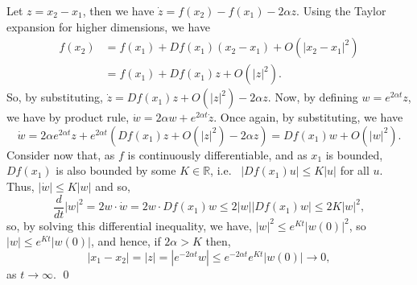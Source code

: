 \documentclass[
]{article}
\theoremstyle{definition}
\begin{document}
Let \(z = x_2 - x_1\), then we have
\(\dot z = f(x_2) - f(x_1) - 2 \alpha z\). Using the Taylor expansion
for higher dimensions, we have \begin{align*}
    f(x_2) & = f(x_1) + Df(x_1)(x_2 - x_1) + O(\left|x_2 - x_1\right|^2)\\
      & = f(x_1) + Df(x_1)z + O(\left|z \right|^2).
  \end{align*} So, by substituting,
\(\dot z = Df(x_1)z + O(\left| z\right|^2) - 2 \alpha z\). Now, by
defining \(w = e^{2\alpha t}z\), we have by product rule,
\(\dot w = 2 \alpha w + e^{2\alpha t} \dot z\). Once again, by
substituting, we have
\[\dot w = 2 \alpha e^{2 \alpha t}z + e^{2 \alpha t}
    (Df(x_1)z + O(\left| z\right|^2) - 2 \alpha z) = Df(x_1)w + O(\left| w \right|^2).\]
Consider now that, as \(f\) is continuously differentiable, and as
\(x_1\) is bounded, \(Df(x_1)\) is also bounded by some
\(K \in \mathbb{R}\), i.e.~
\(\left| Df(x_1)u \right| \le K\left| u \right|\) for all \(u\). Thus,
\(\left| \dot w \right| \le K \left| w \right|\) and so,
\[\frac{d}{dt}\left| w\right|^2 = 2w \cdot \dot w = 2w \cdot Df(x_1)w \le 
    2 \left| w \right| \left| Df(x_1) w \right| \le 2 K \left|w\right|^2,\]
so, by solving this differential inequality, we have,
\(\left|w\right|^2 \le e^{Kt}\left| w(0)\right|^2\), so
\(\left|w\right| \le e^{Kt}\left| w(0)\right|\), and hence, if
\(2\alpha > K\) then,
\[\left| x_1 - x_2\right| = \left| z \right| = \left| e^{-2\alpha t}w \right| 
    \le e^{-2\alpha t}e^{Kt} \left| w(0)\right| \to 0,\] as
\(t \to \infty\). \qed
\end{document}
